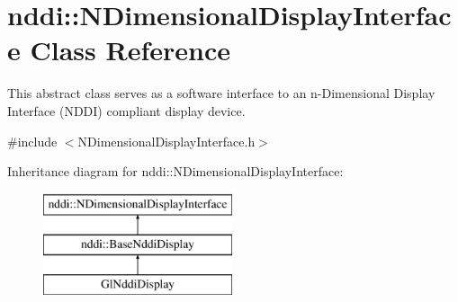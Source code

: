 \hypertarget{classnddi_1_1_n_dimensional_display_interface}{
\section{nddi::NDimensionalDisplayInterface Class Reference}
\label{classnddi_1_1_n_dimensional_display_interface}
}


This abstract class serves as a software interface to an n-\/Dimensional Display Interface (NDDI) compliant display device.  




{\ttfamily \#include $<$NDimensionalDisplayInterface.h$>$}

Inheritance diagram for nddi::NDimensionalDisplayInterface:\begin{figure}[H]
\begin{center}
\leavevmode
\includegraphics[height=3.000000cm]{classnddi_1_1_n_dimensional_display_interface}
\end{center}
\end{figure}
